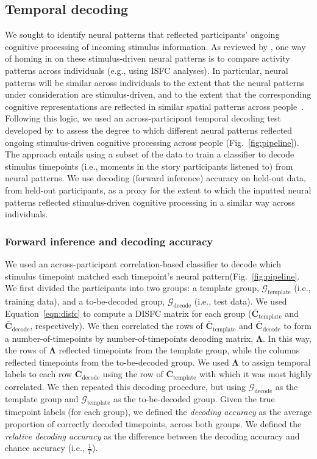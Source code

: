 \documentclass[english]{article}
\begin{document}
\subsection*{Temporal decoding}
We sought to identify neural patterns that reflected participants'
ongoing cognitive processing of incoming stimulus information.  As
reviewed by \cite{SimoEtal16}, one way of homing in on these
stimulus-driven neural patterns is to compare activity patterns across
individuals (e.g., using ISFC analyses).  In particular, neural
patterns will be similar across individuals to the extent that the
neural patterns under consideration are stimulus-driven, and to the
extent that the corresponding cognitive representations are reflected
in similar spatial patterns across people~\citep[also see][]{SimoChan20}.  Following this logic, we
used an across-participant temporal decoding test developed by
\cite{MannEtal18} to assess the degree to which different neural
patterns reflected ongoing stimulus-driven cognitive processing across
people (Fig.~\ref{fig:pipeline}).  The approach entails using a subset of the data to train a
classifier to decode stimulus timepoints (i.e., moments in the story
participants listened to) from neural patterns.  We use decoding
(forward inference) accuracy on held-out data, from held-out
participants, as a proxy for the extent to which the inputted neural
patterns reflected stimulus-driven cognitive processing in a similar
way across individuals.

\subsubsection*{Forward inference and decoding accuracy}
We used an across-participant correlation-based classifier to decode
which stimulus timepoint matched each timepoint's neural pattern(Fig.~\ref{fig:pipeline}.  We
first divided the participants into two groups: a template group,
$\mathcal{G}_{\mathrm{template}}$ (i.e., training data), and a to-be-decoded group,
$\mathcal{G}_{\mathrm{decode}}$ (i.e., test data).  We used Equation~\ref{eqn:disfc} to
compute a DISFC matrix for each group
($\bar{\textbf{C}}_{\mathrm{template}}$ and
$\bar{\textbf{C}}_{\mathrm{decode}}$, respectively).  We then
correlated the rows of $\bar{\textbf{C}}_{\mathrm{template}}$ and
$\bar{\textbf{C}}_{\mathrm{decode}}$ to form a number-of-timepoints by
number-of-timepoints decoding matrix, $\mathbf{\Lambda}$.  In this
way, the rows of $\mathbf{\Lambda}$ reflected timepoints from the
template group, while the columns reflected timepoints from the
to-be-decoded group.  We used $\mathbf{\Lambda}$ to assign temporal
labels to each row $\bar{\textbf{C}}_{\mathrm{decode}}$ using the row
of $\bar{\textbf{C}}_{\mathrm{template}}$ with which it was most
highly correlated.  We then repeated this decoding procedure, but
using $\mathcal{G}_{\mathrm{decode}}$ as the template group and
$\mathcal{G}_{\mathrm{template}}$ as the to-be-decoded group.  Given
the true timepoint labels (for each group), we defined the
\textit{decoding accuracy} as the average proportion of correctly
decoded timepoints, across both groups.  We defined the
\textit{relative decoding accuracy} as the difference between the
decoding accuracy and chance accuracy (i.e., $\frac{1}{T}$).
\end{document}
